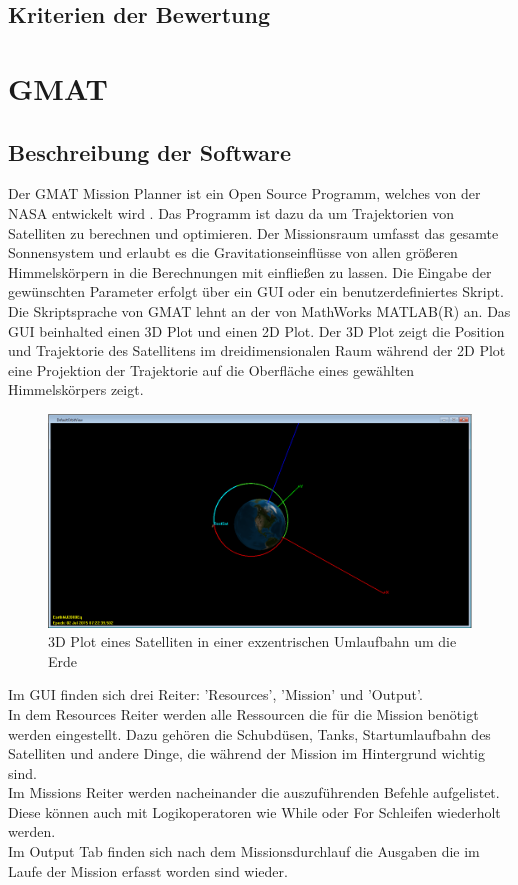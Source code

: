 	\subsection{Kriterien der Bewertung}

	
			
\section{GMAT}
		\subsection{Beschreibung der Software}
		Der GMAT Mission Planner ist ein Open Source Programm, welches von der NASA entwickelt wird \cite{GMAT}. Das Programm ist dazu da um Trajektorien von Satelliten zu berechnen und optimieren. Der Missionsraum umfasst das gesamte Sonnensystem und erlaubt es die Gravitationseinflüsse von allen größeren Himmelskörpern in die Berechnungen mit einfließen zu lassen. 
Die Eingabe der gewünschten Parameter erfolgt über ein GUI oder ein benutzerdefiniertes Skript. Die Skriptsprache von GMAT lehnt an der von MathWorks MATLAB(R) an.
Das GUI beinhalted einen 3D Plot und einen 2D Plot. Der 3D Plot zeigt die Position und Trajektorie des Satellitens im dreidimensionalen Raum während der 2D Plot eine Projektion der Trajektorie auf die Oberfläche eines gewählten Himmelskörpers zeigt.

\begin{figure}[!h]
	\centering
		\includegraphics[width=1.00\textwidth]{graphics/GMAT/GMAT_OrbitView2.PNG}
	\caption{3D Plot eines Satelliten in einer exzentrischen Umlaufbahn um die Erde}
	\label{fig:OrbitView2}
\end{figure}


Im GUI finden sich drei Reiter: ’Resources’, ’Mission’ und ’Output’.\\
In dem Resources Reiter werden alle Ressourcen die für die Mission benötigt werden eingestellt. Dazu gehören die Schubdüsen, Tanks, Startumlaufbahn des Satelliten und andere Dinge, die während der Mission im Hintergrund wichtig sind.\\
Im Missions Reiter werden nacheinander die auszuführenden Befehle aufgelistet. Diese können auch mit Logikoperatoren wie While oder For Schleifen wiederholt werden.\\
Im Output Tab finden sich nach dem Missionsdurchlauf die Ausgaben die im Laufe der Mission erfasst worden sind wieder. 


